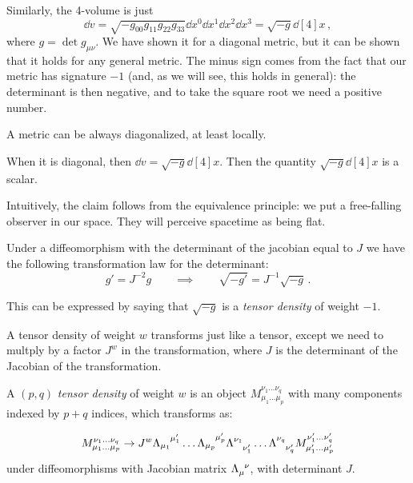 \documentclass[main.tex]{subfiles}
\begin{document}
Similarly, the 4-volume is just 
%
\begin{equation}
  \dd{v} 
  = \sqrt{-g_{00}g_{11}g_{22}g_{33}}
  \dd{x^{0}} \dd{x^{1}} \dd{x^{2}} \dd{x^{3}} 
  = \sqrt{-g}
  \dd[4]{x} 
\,,
\end{equation}
%
where \(g = \det g_{\mu \nu }\). We have shown it for a diagonal metric, but it can be shown that it holds for any general metric. The minus sign comes from the fact that our metric has signature \(-1\) (and, as we will see, this holds in general): the determinant is then negative, and to take the square root we need a positive number.

\begin{claim}[Unproven]
    A metric can be always diagonalized, at least locally.
\end{claim}

When it is diagonal, then \(\dd{v} = \sqrt{-g} \dd[4]{x} \). Then the quantity \(\sqrt{-g} \dd[4]{x} \) is a scalar.

Intuitively, the claim follows from the equivalence principle: we put a free-falling observer in our space. They will perceive spacetime as being flat.

Under a diffeomorphism with the determinant of the jacobian equal to \(J\) we have the following transformation law for the determinant: 
%
\begin{equation}
  g' = J^{-2} g
  \qquad \implies \qquad
  \sqrt{-g'}  = J^{-1} \sqrt{-g} 
\,.
\end{equation}
%

This can be expressed by saying that \(\sqrt{-g} \) is a \emph{tensor density} of weight \(-1\).

\begin{definition}
A tensor density of weight \(w\) transforms just like a tensor, except we need to multply by a factor \(J^{w}\) in the transformation, where \(J\) is the determinant of the Jacobian of the transformation.

A \((p, q)\) \emph{tensor density} of weight \(w\) is an object \(M_{\mu_1 \dots \mu_p}^{\nu_1 \dots \nu_q}\) with many components indexed by \(p+q\) indices, which transforms as:

\begin{equation}
    M_{\mu_1 \dots \mu_p}^{\nu_1 \dots \nu_q}
    \rightarrow
    J^{w}
    \tensor{\Lambda}{_{\mu_1}^{\mu'_1}}\dots
    \tensor{\Lambda}{_{\mu_p}^{\mu'_p}}
    \tensor{\Lambda}{^{\nu_1}_{\nu'_1}}\dots
    \tensor{\Lambda}{^{\nu_q}_{\nu'_q}}
    M_{\mu_1' \dots \mu_p'}^{\nu_1' \dots \nu_q'}
\end{equation}
%
under diffeomorphisms with Jacobian matrix \(\tensor{\Lambda}{_\mu^\nu}\), with determinant \(J\).
\end{definition}
\end{document}
